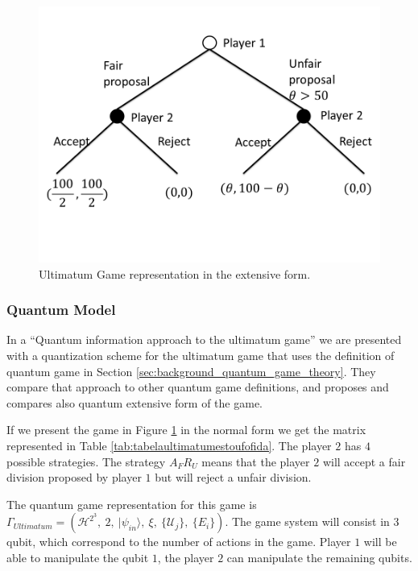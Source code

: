 \begin{figure}[h]
\centering 
\includegraphics[scale=0.35]{Figures/ultimatum/gametree.png}
\caption{Ultimatum Game representation in the extensive form. }
\label{fig:ultimatum:gametree}
\end{figure}

\subsubsection{Quantum Model}
\label{subsec:ultimatum}

In a ``Quantum information approach to the ultimatum game''\cite{Fra2011} we are presented with a quantization scheme for the ultimatum game that uses the definition of quantum game in Section \ref{sec:background_quantum_game_theory}. 
 They compare that approach to other quantum game definitions, and proposes and compares also quantum  extensive form of the game. 


If we present the game in Figure \ref{fig:ultimatum:gametree} in the normal form we get the matrix represented in Table \ref{tab:tabelaultimatumestoufofida}. The player $2$ has $4$ possible strategies. The strategy $A_{F}R_{U}$ means that the player $2$ will accept a fair division proposed by player $1$ but will reject a unfair division.

 The quantum game representation for this game is $
\Gamma_{Ultimatum}=(\mathcal{H}^{2^{3}},\: 2,\:\vert\psi_{in}\rangle,\:\xi,\:\{\mathcal{U}_{j}\},\:\{E_{i}\})
$. The game system will consist in $3$ qubit, which correspond to the number of actions in the game. Player $1$ will be able to manipulate the qubit $1$, the player $2$ can manipulate the remaining qubits. 



